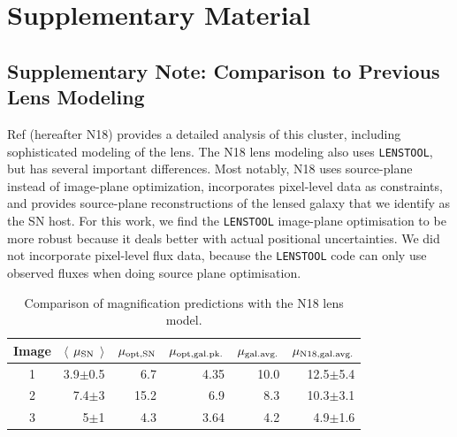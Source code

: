 \documentclass[12pt]{article}
\def\lenstool{{\tt LENSTOOL}\xspace}
\begin{document}
\clearpage

\section*{Supplementary Material}

\subsection*{Supplementary Note: Comparison to Previous Lens Modeling}


Ref \cite{newman_resolving_2018} (hereafter N18) provides a detailed analysis of this cluster, including sophisticated modeling of the lens.  The N18 lens modeling also uses \lenstool, but has several important differences.  Most notably, N18 uses source-plane instead of image-plane optimization, incorporates pixel-level data as constraints, and provides source-plane reconstructions of the lensed galaxy that we identify as the SN host.  
For this work, we find the \lenstool image-plane optimisation to be more robust because it deals better with actual positional uncertainties.  We did not incorporate pixel-level flux data, because the \lenstool code can only use observed fluxes when doing source plane optimisation.  

\setcounter{table}{0} %
\begin{table}[tbp]
    \centering
    \begin{tabular}{crrrrr}
    Image     & $\langle$ $\mu_{\rm SN}$ $\rangle$ & $\mu_{\rm opt,SN}$ & $\mu_{\rm opt,gal.pk.}$ & $\mu_{\rm gal.avg.}$ & $\mu_{\rm N18,gal.avg.}$\\
\hline 
        1 & 3.9$\pm$0.5 &  6.7 & 4.35 & 10.0 & 12.5$\pm$5.4 \\
        2 & 7.4$\pm$3   & 15.2 &  6.9 &  8.3 & 10.3$\pm$3.1 \\
        3 & 5$\pm$1     &  4.3 & 3.64 &  4.2 & 4.9$\pm$1.6 \\
    \end{tabular}
    \caption{
    Comparison of magnification predictions with the N18 lens model.
    }
    \label{tab:mu_comparison}
\end{table}
\end{document}
